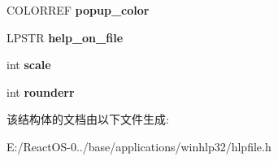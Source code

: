 \begin{DoxyCompactItemize}
$$C\+O\+L\+O\+R\+R\+EF {\bfseries popup\+\_\+color}
\item 
\mbox{\label{structtag_hlp_file_file_af61ac1102e59d360b52e1626e3f83ba2}} 
L\+P\+S\+TR {\bfseries help\+\_\+on\+\_\+file}
\item 
\mbox{\label{structtag_hlp_file_file_a7765d45e960144c2340c4a36b121166d}} 
int {\bfseries scale}
\item 
\mbox{\label{structtag_hlp_file_file_a1e7eb732c8637e629afde580e14bcfa0}} 
int {\bfseries rounderr}
\end{DoxyCompactItemize}


该结构体的文档由以下文件生成\+:\begin{DoxyCompactItemize}
\item 
E\+:/\+React\+O\+S-\/0../base/applications/winhlp32/hlpfile.\+h\end{DoxyCompactItemize}
